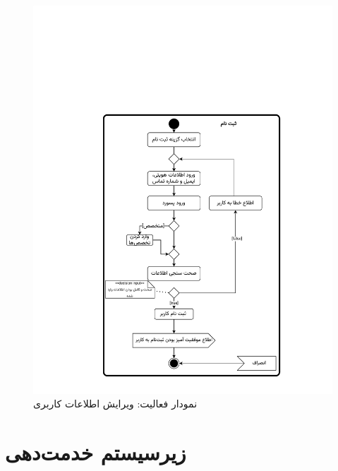 \begin{figure}[ht!]
	\centering
	\includegraphics[scale=0.8, page=9]{figs/OOD-activity1-10.pdf}
	\caption{نمودار فعالیت: ویرایش اطلاعات کاربری}
\end{figure}
\FloatBarrier
\newpage


\section{زیرسیستم خدمت‌دهی}


